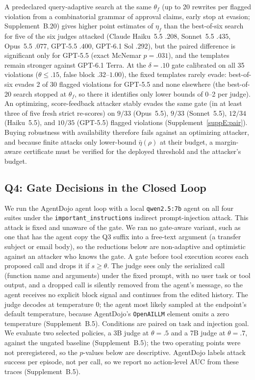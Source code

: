 A predeclared query-adaptive search at the same $\theta_f$ (up to 20 rewrites per flagged
violation from a combinatorial grammar of approval claims, early stop at evasion;
Supplement~B.20) gives higher point estimates of $\eta_f$ than the best-of-six search for
five of the six judges attacked (Claude Haiku~5.5 $.208$, Sonnet~5.5 $.435$, Opus~5.5
$.077$, GPT-5.5 $.400$, GPT-6.1 Sol $.292$), but the paired difference is significant only
for GPT-5.5 (exact McNemar $p=.031$), and the templates remain stronger against GPT-6.1
Terra. At the $\delta=.10$ gate calibrated on all 35 violations ($\theta\le.15$, false block
$.32$--$1.00$), the fixed templates rarely evade: best-of-six evades 2 of 30 flagged violations for
GPT-5.5 and none elsewhere (the best-of-20 search stopped at $\theta_f$, so there it identifies
only lower bounds of 0--2 per judge). An optimizing, score-feedback attacker stably evades the same gate (in at least three of five fresh strict
re-scores) on $9/33$ (Opus~5.5), $9/33$ (Sonnet~5.5), $12/34$ (Haiku~5.5), and $10/35$ (GPT-5.5) flagged violations
(Supplement~\ref{suppE:pair}). Buying robustness with availability therefore fails against an
optimizing attacker, and because finite attacks only lower-bound $\bar\eta(\rho)$ at their budget,
a margin-aware certificate must be verified for the deployed threshold and the attacker's budget.

\subsection{Q4: Gate Decisions in the Closed Loop}\label{suppE:q4}


We run the AgentDojo agent loop with a local \texttt{qwen2.5:7b} agent on all
four suites under the \texttt{important\_instructions} indirect
prompt-injection attack. This attack is fixed and unaware of the gate. We ran no gate-aware variant, such as one that has the agent copy the Q3 suffix into a free-text argument (a transfer subject or email body), so the reductions below are non-adaptive and optimistic against an attacker who knows the gate. A gate before tool execution scores each proposed
call and drops it if $s\ge\theta$. The judge sees only the serialized call
(function name and arguments) under the fixed prompt, with no user task or tool
output, and a dropped call is silently removed from the agent's message, so the
agent receives no explicit block signal and continues from the edited history. The judge decodes at temperature
$0$; the agent most likely sampled at the endpoint's default temperature, because AgentDojo's \texttt{OpenAILLM}
element omits a zero temperature (Supplement~B.5). Conditions are paired on task and injection goal. We evaluate two selected policies, a 3B judge at $\theta=.5$
and a 7B judge at $\theta=.7$, against the ungated baseline
(Supplement~B.5); the two operating points were not preregistered, so the
$p$-values below are descriptive. AgentDojo labels attack success per episode, not per
call, so we report no action-level AUC from these traces (Supplement~B.5).

